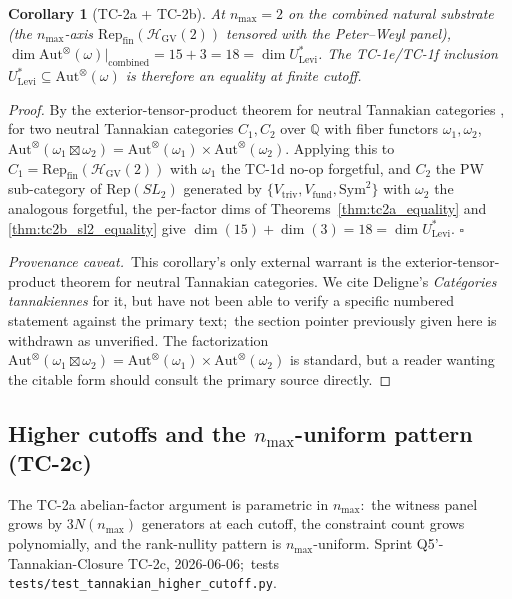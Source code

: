 \documentclass[11pt,a4paper]{article}
\theoremstyle{plain}
\newtheorem{corollary}[theorem]{Corollary}
\theoremstyle{definition}
\newcommand{\nmax}{n_{\max}}
\newcommand{\HGV}{\mathcal{H}_{\mathrm{GV}}}
\newcommand{\Repcat}{\mathrm{Rep}_{\mathrm{fin}}}
\newcommand{\Aut}{\mathrm{Aut}}
\newcommand{\Q}{\mathbb{Q}}
\newcommand{\Ulev}{U^{*}_{\mathrm{Levi}}}
\newcommand{\fibfun}{\omega}
\newcommand{\Rep}{\mathrm{Rep}}
\begin{document}
\begin{corollary}[TC-2a + TC-2b]\label{cor:combined_equality}
At $\nmax = 2$ on the combined natural substrate (the
$\nmax$-axis $\Repcat(\HGV(2))$ tensored with the Peter--Weyl panel),
$\dim \Aut^{\otimes}(\fibfun)\big|_{\mathrm{combined}} = 15 + 3
= 18 = \dim \Ulev$. The TC-1e/TC-1f inclusion $\Ulev \subseteq
\Aut^{\otimes}(\fibfun)$ is therefore an equality at finite cutoff.
\end{corollary}

\begin{proof}
By the exterior-tensor-product theorem for neutral Tannakian
categories \cite{deligne1990}, for two neutral
Tannakian categories $C_{1}, C_{2}$ over $\Q$ with fiber functors
$\omega_{1}, \omega_{2}$,
$\Aut^{\otimes}(\omega_{1} \boxtimes \omega_{2}) = \Aut^{\otimes}(\omega_{1})
\times \Aut^{\otimes}(\omega_{2})$. Applying this to $C_{1} =
\Repcat(\HGV(2))$ with $\omega_{1}$ the TC-1d no-op forgetful, and
$C_{2}$ the PW sub-category of $\Rep(SL_{2})$ generated by
$\{V_{\mathrm{triv}}, V_{\mathrm{fund}}, \mathrm{Sym}^{2}\}$ with
$\omega_{2}$ the analogous forgetful, the per-factor dims of
Theorems~\ref{thm:tc2a_equality} and \ref{thm:tc2b_sl2_equality}
give $\dim(15) + \dim(3) = 18 = \dim \Ulev$.
$\square$

\emph{Provenance caveat.}\ This corollary's only external warrant is the
exterior-tensor-product theorem for neutral Tannakian categories.  We cite
Deligne's \emph{Cat\'egories tannakiennes} for it, but have not been able to
verify a specific numbered statement against the primary text;\ the section
pointer previously given here is withdrawn as unverified.  The factorization
$\mathrm{Aut}^{\otimes}(\omega_{1} \boxtimes \omega_{2}) = \mathrm{Aut}^{\otimes}(\omega_{1}) \times \mathrm{Aut}^{\otimes}(\omega_{2})$
is standard, but a reader wanting the citable form should consult the
primary source directly.
\end{proof}

\subsection{Higher cutoffs and the $\nmax$-uniform pattern (TC-2c)}\label{sec:tc2c_higher_cutoff}

The TC-2a abelian-factor argument is parametric in $\nmax$:\ the
witness panel grows by $3 N(\nmax)$ generators at each cutoff, the
constraint count grows polynomially, and the rank-nullity pattern is
$\nmax$-uniform. Sprint Q5'-Tannakian-Closure TC-2c, 2026-06-06;\
tests
\texttt{tests/test\_tannakian\_higher\_cutoff.py}.
\end{document}
